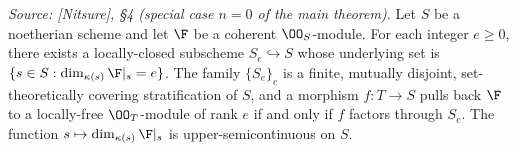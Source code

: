 \begin{lemma}
  \textit{Source: [Nitsure], \S4 (special case \(n=0\) of the main theorem).}
  Let \(S\) be a noetherian scheme and let \(\F\) be a coherent \(\OO_S\)-module.
  For each integer \(e \ge 0\), there exists a locally-closed subscheme
  \(S_e \hookrightarrow S\) whose underlying set is
  \(\{s \in S : \dim_{\kappa(s)} \F|_s = e\}\). The family \(\{S_e\}_e\) is a
  finite, mutually disjoint, set-theoretically covering stratification of \(S\),
  and a morphism \(f : T \to S\) pulls back \(\F\) to a locally-free
  \(\OO_T\)-module of rank \(e\) if and only if \(f\) factors through \(S_e\).  The
  function \(s \mapsto \dim_{\kappa(s)} \F|_s\) is upper-semicontinuous on \(S\).
\end{lemma}


